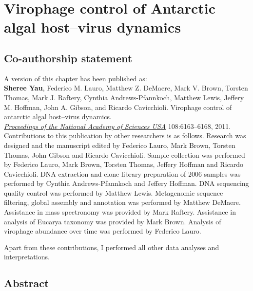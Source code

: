\chapter{Virophage control of Antarctic algal host--virus dynamics}
\label{ch:olv}
\acresetall

\section*{Co-authorship statement}

A version of this chapter has been published as:\\

\textbf{Sheree Yau}, Federico M. Lauro, Matthew Z. DeMaere, Mark V. Brown, Torsten Thomas,
Mark J. Raftery, Cynthia Andrews-Pfannkoch, Matthew Lewis, Jeffery M. Hoffman, John A. Gibson, and
Ricardo Cavicchioli.
Virophage control of antarctic algal host--virus dynamics.\\
\emph{\underline{Proceedings of the National Academy of Sciences USA}}
108:6163--6168, 2011.\\

Contributions to this publication by other researchers is as follows.
Research was designed and the manuscript edited by Federico Lauro, Mark Brown, Torsten Thomas, John Gibson and Ricardo Cavicchioli.
Sample collection was performed by Federico Lauro, Mark Brown, Torsten Thomas, Jeffery Hoffman and Ricardo Cavicchioli.
\textsc{DNA} extraction and clone library preparation of 2006 samples was performed by Cynthia Andrews-Pfannkoch and Jeffery Hoffman.
\textsc{DNA} sequencing quality control was performed by Matthew Lewis.
Metagenomic sequence filtering, global assembly and annotation was performed by Matthew DeMaere.
Assistance in mass spectronomy was provided by Mark Raftery.
Assistance in analysis of Eucarya taxonomy was provided by Mark Brown.
Analysis of virophage abundance over time was performed by Federico Lauro.

Apart from these contributions, I performed all other data analyses and interpretations.
\newpage


\section{Abstract}

